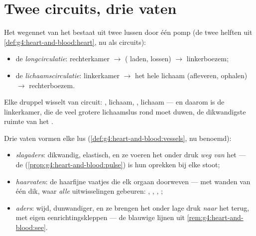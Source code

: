 \section{Twee circuits, drie vaten}

\begin{definition}\label{def:g7:heart-and-circulation:double}
Het wegennet van het  bestaat uit twee lussen door één pomp (de twee
helften uit \cref{def:g4:heart-and-blood:heart}, nu als circuits):
\begin{itemize}
  \item de \emph{longcirculatie}: rechterkamer $\rightarrow$ 
        ( laden,  lossen) $\rightarrow$
        linkerboezem;
  \item de \emph{lichaamscirculatie}: linkerkamer $\rightarrow$ het hele
        lichaam (afleveren, ophalen) $\rightarrow$ rechterboezem.
\end{itemize}
Elke druppel wisselt van circuit: , lichaam, , lichaam --- en
daarom is de linkerkamer, die de veel grotere lichaamslus rond moet
duwen, de dikwandigste ruimte van het .
\end{definition}

\begin{definition}\label{def:g7:heart-and-circulation:vessels}
Drie  vaten vormen elke lus
(\cref{def:g4:heart-and-blood:vessels}, nu benoemd):
\begin{itemize}
  \item \emph{slagaders}: dikwandig, elastisch, en ze
        voeren het  onder druk \emph{weg van} het  --- de
         (\cref{prop:g4:heart-and-blood:pulse}) is hun oprekken
        bij elke stoot;
  \item \emph{haarvaten}: de haarfijne vaatjes die elk
        orgaan doorweven --- met wanden van één  dik, waar
        \emph{alle} uitwisselingen gebeuren: , ,
        , ;
  \item \emph{aders}: wijd, dunwandiger, en ze brengen het
         onder lage druk \emph{naar} het  terug, met eigen
        eenrichtingskleppen --- de blauwige lijnen uit
        \cref{rem:g4:heart-and-blood:see}.
\end{itemize}
\end{definition}

